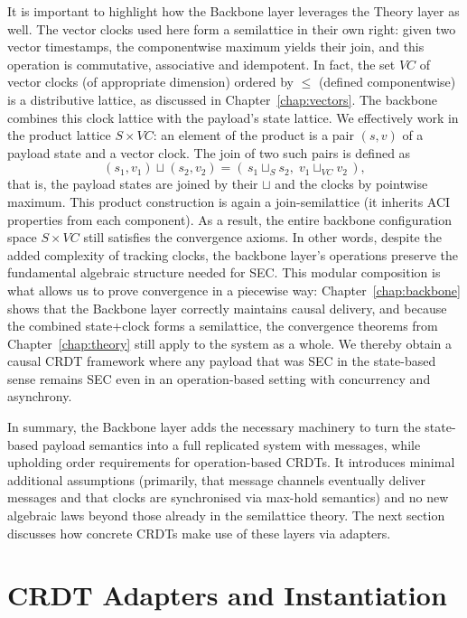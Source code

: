It is important to highlight how the Backbone layer leverages the Theory layer as well. The vector clocks used here form a semilattice in their own right: given two vector timestamps, the componentwise maximum yields their join, and this operation is commutative, associative and idempotent. In fact, the set $VC$ of vector clocks (of appropriate dimension) ordered by $\leq$ (defined componentwise) is a distributive lattice, as discussed in Chapter~\ref{chap:vectors}. The backbone combines this clock lattice with the payload’s state lattice. We effectively work in the product lattice $S \times VC$: an element of the product is a pair $(s, v)$ of a payload state and a vector clock. The join of two such pairs is defined as
\[
  (s_1, v_1)\sqcup(s_2, v_2) = (\,s_1\sqcup_S s_2,\; v_1\sqcup_{VC} v_2\,),
\]
that is, the payload states are joined by their $\sqcup$ and the clocks by pointwise maximum. This product construction is again a join-semilattice (it inherits ACI properties from each component). As a result, the entire backbone configuration space $S \times VC$ still satisfies the convergence axioms. In other words, despite the added complexity of tracking clocks, the backbone layer’s operations preserve the fundamental algebraic structure needed for SEC. This modular composition is what allows us to prove convergence in a piecewise way: Chapter~\ref{chap:backbone} shows that the Backbone layer correctly maintains causal delivery, and because the combined state+clock forms a semilattice, the convergence theorems from Chapter~\ref{chap:theory} still apply to the system as a whole. We thereby obtain a causal CRDT framework where any payload that was SEC in the state-based sense remains SEC even in an operation-based setting with concurrency and asynchrony.

In summary, the Backbone layer adds the necessary machinery to turn the state-based payload semantics into a full replicated system with messages, while upholding order requirements for operation-based CRDTs. It introduces minimal additional assumptions (primarily, that message channels eventually deliver messages and that clocks are synchronised via max-hold semantics) and no new algebraic laws beyond those already in the semilattice theory. The next section discusses how concrete CRDTs make use of these layers via adapters.

\section{CRDT Adapters and Instantiation}
\label{sec:crdt-adapters}

